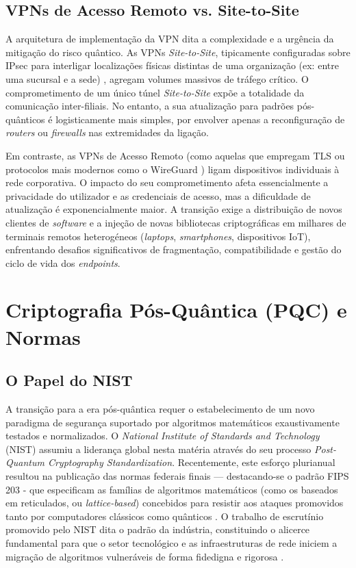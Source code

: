 \documentclass[runningheads]{llncs}
\begin{document}
\subsection{VPNs de Acesso Remoto vs. Site-to-Site}
A arquitetura de implementação da VPN dita a complexidade e a urgência da mitigação do risco quântico. As VPNs \textit{Site-to-Site}, tipicamente configuradas sobre IPsec para interligar localizações físicas distintas de uma organização (ex: entre uma sucursal e a sede) \cite{oterogarcia2025introducingpostquantumalgorithmsopen}, agregam volumes massivos de tráfego crítico. O comprometimento de um único túnel \textit{Site-to-Site} expõe a totalidade da comunicação inter-filiais. No entanto, a sua atualização para padrões pós-quânticos é logisticamente mais simples, por envolver apenas a reconfiguração de \textit{routers} ou \textit{firewalls} nas extremidades da ligação.

Em contraste, as VPNs de Acesso Remoto (como aquelas que empregam TLS ou protocolos mais modernos como o WireGuard \cite{10827179}) ligam dispositivos individuais à rede corporativa. O impacto do seu comprometimento afeta essencialmente a privacidade do utilizador e as credenciais de acesso, mas a dificuldade de atualização é exponencialmente maior. A transição exige a distribuição de novos clientes de \textit{software} e a injeção de novas bibliotecas criptográficas em milhares de terminais remotos heterogéneos (\textit{laptops}, \textit{smartphones}, dispositivos IoT), enfrentando desafios significativos de fragmentação, compatibilidade e gestão do ciclo de vida dos \textit{endpoints}.

\section{Criptografia Pós-Quântica (PQC) e Normas}

\subsection{O Papel do NIST}
A transição para a era pós-quântica requer o estabelecimento de um novo paradigma de segurança suportado por algoritmos matemáticos exaustivamente testados e normalizados. O \textit{National Institute of Standards and Technology} (NIST) assumiu a liderança global nesta matéria através do seu processo \textit{Post-Quantum Cryptography Standardization}. Recentemente, este esforço plurianual resultou na publicação das normas federais finais --- destacando-se o padrão FIPS 203 - que especificam as famílias de algoritmos matemáticos (como os baseados em reticulados, ou \textit{lattice-based}) concebidos para resistir aos ataques promovidos tanto por computadores clássicos como quânticos \cite{nist2024fips203}. O trabalho de escrutínio promovido pelo NIST dita o padrão da indústria, constituindo o alicerce fundamental para que o setor tecnológico e as infraestruturas de rede iniciem a migração de algoritmos vulneráveis de forma fidedigna e rigorosa \cite{kundu2026postquantumcryptographicanalysismessage}.
\end{document}
